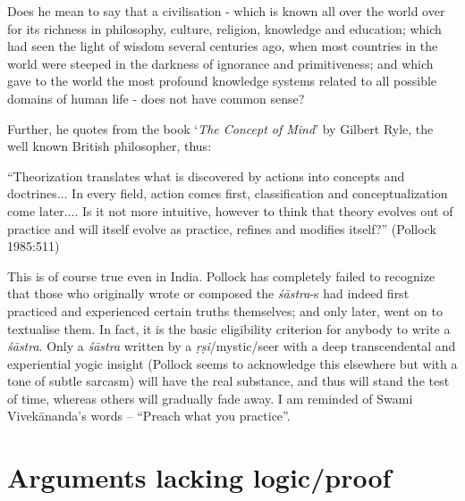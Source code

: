 Does he mean to say that a civilisation - which is known all over the world over for its richness in philosophy, culture, religion, knowledge and education; which had seen the light of wisdom several centuries ago, when most countries in the world were steeped in the darkness of ignorance and primitiveness; and which gave to the world the most profound knowledge systems related to all possible domains of human life - does not have common sense?

Further, he quotes from the book `\textsl{The Concept of Mind}' by Gilbert Ryle, the well known British philosopher, thus: 
\begin{myquote}
``Theorization translates what is discovered by actions into concepts and doctrines... In every field, action comes first, classification and conceptualization come later.... Is it not more intuitive, however to think that theory evolves out of practice and will itself evolve as practice, refines and modifies itself?'' 
\hfill (Pollock 1985:511)
\end{myquote}

This is of course true even in India. Pollock has completely failed to recognize that those who originally wrote or composed the {\it śāstra}-s had indeed first practiced and experienced certain truths themselves; and only later, went on to textualise them. In fact, it is the basic eligibility criterion for anybody to write a {\it śāstra}. Only a {\it śāstra} written by a {\it ṛṣi}/mystic/seer with a deep transcendental and experiential yogic insight (Pollock seems to acknowledge this elsewhere but with a tone of subtle sarcasm) will have the real substance, and thus will stand the test of time, whereas others will gradually fade away. I am reminded of Swami Vivekānanda's  words -- ``Preach what you practice''.

\section*{Arguments lacking logic/proof}

